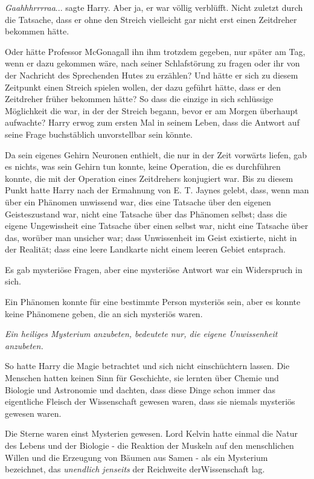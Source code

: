 \glqq \emph{Gaahhhrrrraa}...\grqq{} sagte Harry. Aber ja, er war völlig
verblüfft. Nicht zuletzt durch die Tatsache, dass er ohne den Streich vielleicht
gar nicht erst einen Zeitdreher bekommen hätte.

Oder hätte Professor McGonagall ihn ihm trotzdem gegeben, nur später am Tag,
wenn er dazu gekommen wäre, nach seiner Schlafstörung zu fragen oder ihr von der
Nachricht des Sprechenden Hutes zu erzählen? Und hätte er sich zu diesem
Zeitpunkt einen Streich spielen wollen, der dazu geführt hätte, dass er den
Zeitdreher früher bekommen hätte? So dass die einzige in sich schlüssige
Möglichkeit die war, in der der Streich begann, bevor er am Morgen überhaupt
aufwachte? Harry erwog zum ersten Mal in seinem Leben, dass die Antwort auf
seine Frage buchstäblich unvorstellbar sein könnte.

Da sein eigenes Gehirn Neuronen enthielt, die nur in der Zeit vorwärts liefen,
gab es nichts, was sein Gehirn tun konnte, keine Operation, die es durchführen
konnte, die mit der Operation eines Zeitdrehers konjugiert war. Bis zu diesem
Punkt hatte Harry nach der Ermahnung von E. T. Jaynes gelebt, dass, wenn man
über ein Phänomen unwissend war, dies eine Tatsache über den eigenen
Geisteszustand war, nicht eine Tatsache über das Phänomen selbst; dass die
eigene Ungewissheit eine Tatsache über einen selbst war, nicht eine Tatsache
über das, worüber man unsicher war; dass Unwissenheit im Geist existierte, nicht
in der Realität; dass eine leere Landkarte nicht einem leeren Gebiet entsprach.

Es gab mysteriöse Fragen, aber eine mysteriöse Antwort war ein Widerspruch in
sich.

Ein Phänomen konnte für eine bestimmte Person mysteriös sein, aber es konnte
keine Phänomene geben, die an sich mysteriös waren.

\emph{Ein heiliges Mysterium anzubeten, bedeutete nur, die eigene Unwissenheit
anzubeten.}

So hatte Harry die Magie betrachtet und sich nicht einschüchtern lassen. Die
Menschen hatten keinen Sinn für Geschichte, sie lernten über Chemie und Biologie
und Astronomie und dachten, dass diese Dinge schon immer das eigentliche Fleisch
der Wissenschaft gewesen waren, dass sie niemals mysteriös gewesen waren.

Die Sterne waren einst Mysterien gewesen. Lord Kelvin hatte einmal die Natur des
Lebens und der Biologie - die Reaktion der Muskeln auf den menschlichen Willen
und die Erzeugung von Bäumen aus Samen - als ein Mysterium bezeichnet, das
\emph{\glqq unendlich jenseits\grqq{} } der Reichweite derWissenschaft lag.

